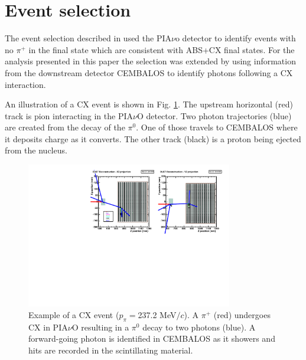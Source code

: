 \section{\label{sec:selection}Event selection}
The event selection described in \cite{duet} used the PIA$\nu$o detector to identify events with no $\pi^{+}$ in the final state which are consistent with ABS+CX final states. For the analysis presented in this paper the selection was extended by using information from the downstream detector CEMBALOS to identify photons following a CX interaction. 

An illustration of a CX event is shown in Fig. \ref{fig:ev_disp}. The upstream horizontal (red) track is pion interacting in the PIA$\nu$O detector. Two photon trajectories (blue) are created from the decay of the $\pi^0$. One of those travels to CEMBALOS where it deposits charge as it converts. The other track (black) is a proton being ejected from the nucleus.

\begin{figure}[ht]
    \includegraphics[width=90mm]{figures/ev_display_27_9029_intr4_ntag267.pdf}
    \caption{Example of a CX event ($p_\pi=$237.2 MeV$/c$). A $\pi^+$ (red) undergoes CX in PIA$\nu$O resulting in a $\pi^0$ decay to two photons (blue). A forward-going photon is identified in CEMBALOS as it showers and hits are recorded in the scintillating material.}
    \label{fig:ev_disp}
\end{figure}

